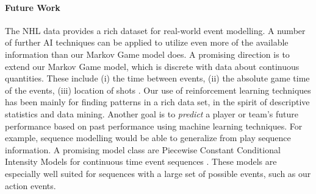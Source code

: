 \documentclass[]{article}
\begin{document}
\paragraph{Future Work} The NHL data provides a rich dataset for real-world event modelling. A number of further AI techniques can be applied to utilize even more of the available information than our Markov Game model does. A promising direction is to extend our Markov Game model, which is discrete with data about continuous quantities. These include (i) the time between events, %
(ii) the absolute game time of the events, %
(iii) location of shots \citep{Krzywicki2005}.
%
Our use of reinforcement learning techniques has been mainly for finding patterns in a rich data set, in the spirit of descriptive statistics and data mining. Another goal is to {\em predict} a player or team's future performance based on past performance using machine learning techniques. %
For example, sequence modelling would be able to generalize from play sequence information. A promising model class are Piecewise Constant Conditional Intensity Models for continuous time event sequences \citep{Gunawardana2011,Parikh2012}. These models are especially well suited for sequences with a large set of possible events, such as our action events.

%
%

\end{document}
